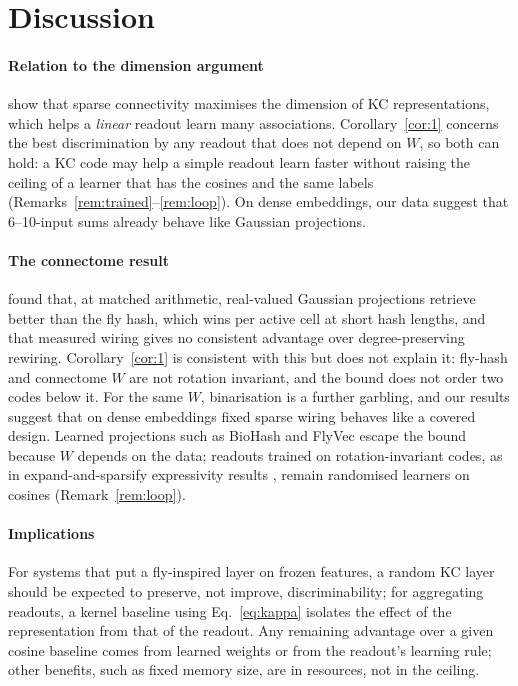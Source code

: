 \documentclass[preprint,12pt,authoryear]{elsarticle}
\theoremstyle{remark}
\begin{document}
\section{Discussion}\label{sec:disc}
\paragraph{Relation to the dimension argument} \citet{litwinkumar2017} show that sparse connectivity maximises
the dimension of KC representations, which helps a \emph{linear} readout learn many associations.
Corollary~\ref{cor:1} concerns the best discrimination by any readout that does not depend on $W$, so both can
hold: a KC code may help a simple readout learn faster without raising the ceiling of a learner that has the
cosines and the same labels (Remarks~\ref{rem:trained}--\ref{rem:loop}). On dense embeddings, our data suggest
that 6--10-input sums already behave like Gaussian projections.

\paragraph{The connectome result} \citet{senge2026} found that, at matched arithmetic, real-valued Gaussian
projections retrieve better than the fly hash, which wins per active cell at short hash lengths, and that measured
wiring gives no consistent advantage over degree-preserving rewiring. Corollary~\ref{cor:1} is consistent with this
but does not explain it: fly-hash and connectome $W$ are not rotation invariant, and the bound does not order
two codes below it. For the same $W$, binarisation is a further garbling, and our results suggest that on dense
embeddings fixed sparse wiring behaves like a covered design. Learned projections such as BioHash
\citep{ryali2020} and FlyVec \citep{liang2021} escape the bound because $W$ depends on the data; readouts trained
on rotation-invariant codes, as in expand-and-sparsify expressivity results \citep{dasgupta2020}, remain
randomised learners on cosines (Remark~\ref{rem:loop}).

\paragraph{Implications} For systems that put a fly-inspired layer on frozen features, a random KC layer
should be expected to preserve, not improve, discriminability; for aggregating readouts, a kernel baseline
using Eq.~\eqref{eq:kappa} isolates the effect of the representation from that of the readout. Any remaining
advantage over a given cosine baseline comes from learned weights or from the readout's learning rule; other
benefits, such as fixed memory size, are in resources, not in the ceiling.
\end{document}
